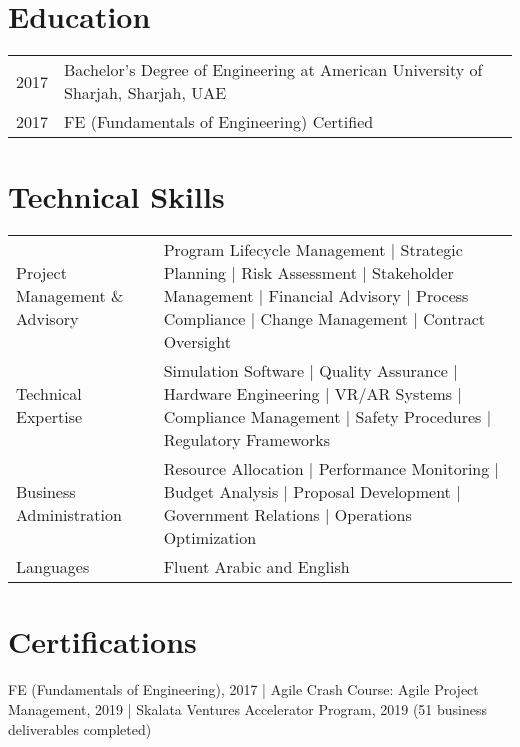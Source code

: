 \documentclass[a4paper,12pt]{article}
\begin{document}
\section{Education}
\begin{tabularx}{\linewidth}{@{}l X@{}}
2017 & Bachelor's Degree of Engineering at American University of Sharjah, Sharjah, UAE \\
2017 & FE (Fundamentals of Engineering) Certified \\
\end{tabularx}

\section{Technical Skills}
\begin{tabularx}{\linewidth}{@{}l X@{}}
Project Management \& Advisory & Program Lifecycle Management | Strategic Planning | Risk Assessment | Stakeholder Management | Financial Advisory | Process Compliance | Change Management | Contract Oversight \\
Technical Expertise & Simulation Software | Quality Assurance | Hardware Engineering | VR/AR Systems | Compliance Management | Safety Procedures | Regulatory Frameworks \\
Business Administration & Resource Allocation | Performance Monitoring | Budget Analysis | Proposal Development | Government Relations | Operations Optimization \\
Languages & Fluent Arabic and English \\
\end{tabularx}

\section{Certifications}
FE (Fundamentals of Engineering), 2017 | Agile Crash Course: Agile Project Management, 2019 | Skalata Ventures Accelerator Program, 2019 (51 business deliverables completed)
\end{document}
